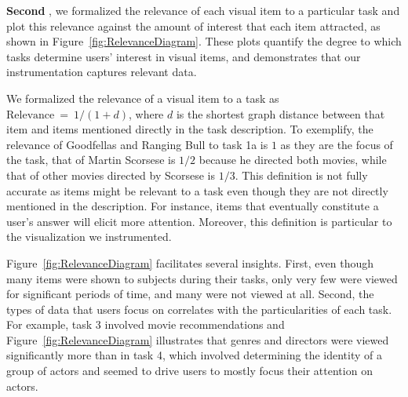 \vspace{2mm}\noindent
\textbf{Second }, we formalized the relevance of each visual item to a particular task and plot this relevance against the amount of interest that each item attracted, as shown in Figure~\ref{fig:RelevanceDiagram}. These plots quantify the degree to which tasks determine users' interest in visual items, and demonstrates that our instrumentation captures relevant data.    

We formalized the relevance of a visual item to a task as $\text{Relevance}~=~1/(1+d)$, where $d$  is the shortest graph distance between that item and items mentioned directly in the task description.  To exemplify, the relevance of Goodfellas and Ranging Bull to task 1a is $1$ as they are the focus of the task, that of Martin Scorsese is $1/2$  because he directed both movies, while that of other movies directed by Scorsese is $1/3$. This definition is not fully accurate as items might be relevant to a task even though they are not directly mentioned in the description.  For instance, items that eventually constitute a user's answer will elicit more attention. Moreover, this definition is particular to the visualization we instrumented.

Figure~\ref{fig:RelevanceDiagram} facilitates several insights. First, even though many items were shown to subjects during their tasks, only very few were viewed for significant periods of time, and many were not viewed at all. Second, the types of data that users focus on correlates with the particularities of each task. For example, task 3 involved movie recommendations and Figure~\ref{fig:RelevanceDiagram} illustrates that genres and directors were viewed significantly more than in task 4, which involved determining the identity of a group of actors and seemed to drive users to mostly focus their attention on actors. 

